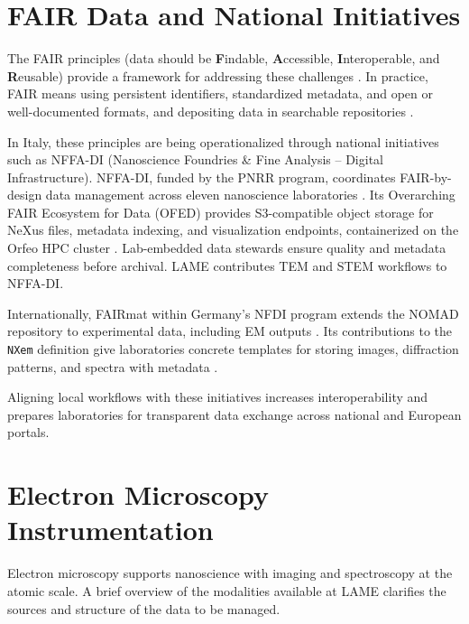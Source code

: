 \section{FAIR Data and National Initiatives}

The FAIR principles (data should be \textbf{F}indable, \textbf{A}ccessible, \textbf{I}nteroperable, and \textbf{R}eusable) provide a framework for addressing these challenges \parencite{Wilkinson2016FAIR,GOFAIRPrinciples}. 
In practice, FAIR means using persistent identifiers, standardized metadata, and open or well-documented formats, and depositing data in searchable repositories \parencite{EC2018TurningFAIR,EC2021HEGuide}. 

In Italy, these principles are being operationalized through national initiatives such as NFFA-DI (Nanoscience Foundries \& Fine Analysis – Digital Infrastructure). 
NFFA-DI, funded by the PNRR program, coordinates FAIR-by-design data management across eleven nanoscience laboratories \parencite{nffamaster2024}. 
Its Overarching FAIR Ecosystem for Data (OFED) provides S3-compatible object storage for NeXus files, metadata indexing, and visualization endpoints, containerized on the Orfeo HPC cluster \parencite{ofedslides}. 
Lab-embedded data stewards ensure quality and metadata completeness before archival. 
LAME contributes TEM and STEM workflows to NFFA-DI.

Internationally, FAIRmat within Germany’s NFDI program extends the NOMAD repository to experimental data, including EM outputs \parencite{fairmatPortal}. 
Its contributions to the \texttt{NXem} definition give laboratories concrete templates for storing images, diffraction patterns, and spectra with metadata \parencite{fairmathdf5}. 

Aligning local workflows with these initiatives increases interoperability and prepares laboratories for transparent data exchange across national and European portals.

\section{Electron Microscopy Instrumentation}

Electron microscopy supports nanoscience with imaging and spectroscopy at the atomic scale. 
A brief overview of the modalities available at LAME clarifies the sources and structure of the data to be managed.

